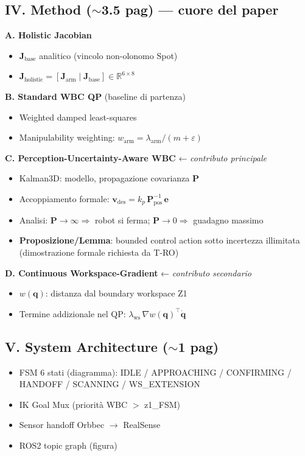 \documentclass[a4paper,11pt]{article}
\begin{document}
\subsection*{IV. Method ($\sim$3.5 pag) \textnormal{--- cuore del paper}}

\textbf{A. Holistic Jacobian}
\begin{itemize}
  \item $\mathbf{J}_{\text{base}}$ analitico (vincolo non-olonomo Spot)
  \item $\mathbf{J}_{\text{holistic}} = [\mathbf{J}_{\text{arm}} \mid \mathbf{J}_{\text{base}}] \in \mathbb{R}^{6\times8}$
\end{itemize}

\textbf{B. Standard WBC QP} (baseline di partenza)
\begin{itemize}
  \item Weighted damped least-squares
  \item Manipulability weighting: $w_{\text{arm}} = \lambda_{\text{arm}}/(m+\varepsilon)$
\end{itemize}

\textbf{C. Perception-Uncertainty-Aware WBC} ← \textit{contributo principale}
\begin{itemize}
  \item Kalman3D: modello, propagazione covarianza $\mathbf{P}$
  \item Accoppiamento formale:
        $\mathbf{v}_{\text{des}} = k_p \,\mathbf{P}_{\text{pos}}^{-1}\,\mathbf{e}$
  \item Analisi: $\mathbf{P}\to\infty \Rightarrow$ robot si ferma;
        $\mathbf{P}\to 0 \Rightarrow$ guadagno massimo
  \item \textbf{Proposizione/Lemma}: bounded control action sotto incertezza
        illimitata (dimostrazione formale richiesta da T-RO)
\end{itemize}

\textbf{D. Continuous Workspace-Gradient} ← \textit{contributo secondario}
\begin{itemize}
  \item $w(\mathbf{q})$: distanza dal boundary workspace Z1
  \item Termine addizionale nel QP:
        $\lambda_{\text{ws}}\,\nabla w(\mathbf{q})^\top \dot{\mathbf{q}}$
\end{itemize}

\subsection*{V. System Architecture ($\sim$1 pag)}
\begin{itemize}
  \item FSM 6 stati (diagramma): IDLE / APPROACHING / CONFIRMING /
        HANDOFF / SCANNING / WS\_EXTENSION
  \item IK Goal Mux (priorità WBC $>$ z1\_FSM)
  \item Sensor handoff Orbbec $\to$ RealSense
  \item ROS2 topic graph (figura)
\end{itemize}
\end{document}
